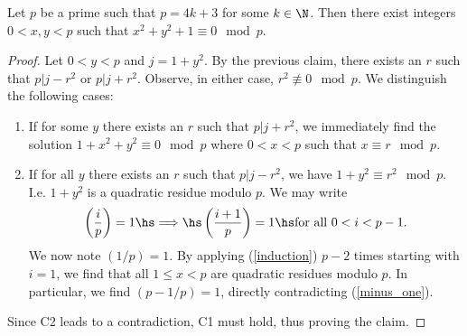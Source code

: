 \documentclass{article}
\begin{document}
\begin{claim*}[2]
	Let $p$ be a prime such that $p=4k+3$ for some $k\in\N$. Then there exist
	integers $0<x,y<p$ such that $x^2+y^2+1\equiv 0\mod p$.
	\begin{proof}
		Let $0<y<p$ and $j=1+y^2$. By the previous claim, there exists an $r$ such that
		$p|j-r^2$ or $p|j+r^2$. Observe, in either case, $r^2\not\equiv 0\mod p$. We distinguish the following cases:
		\begin{enumerate}[label=C\arabic*.]
			\item If for some $y$ there exists an $r$ such that $p|j+r^2$, we immediately find the
			      solution $1+x^2+y^2\equiv 0\mod p$ where $0<x<p$ such that $x\equiv r\mod p$.
			\item If for all $y$ there exists an $r$ such that $p|j-r^2$, we have $1+y^2\equiv r^2\mod p$.
			      I.e. $1+y^2$ is a quadratic residue modulo $p$. We may write
			      \begin{align}
				      \label{induction}
				      \left(\frac{i}{p}\right)=1\hs\Longrightarrow\hs \left(\frac{i+1}{p}\right)=1 \hs \text{for all }0<i<p-1.
			      \end{align}
			      We now note $(1/p)=1$.  By applying (\ref{induction}) $p-2$ times starting with $i=1$, we find that
			      all $1\leq x<p$ are quadratic residues modulo $p$. In particular, we find $(p-1/p)=1$, directly contradicting (\ref{minus_one}).
		\end{enumerate}
		Since C2 leads to a contradiction, C1 must hold, thus proving the claim.
	\end{proof}
\end{claim*}
\end{document}
